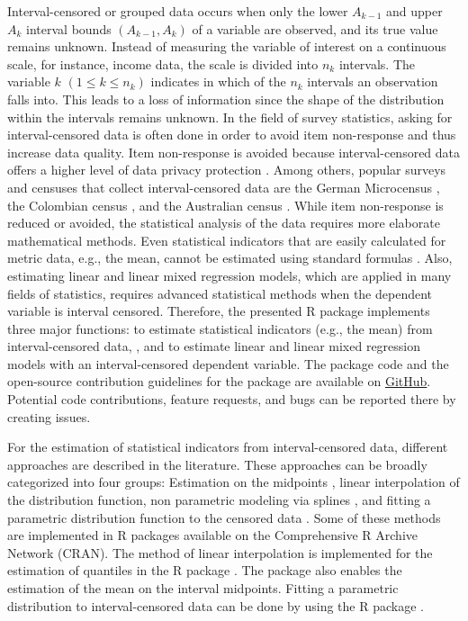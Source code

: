 Interval-censored or grouped data occurs when only the lower $A_{k-1}$ and upper  $A_{k}$ interval bounds $(A_{k-1},A_{k})$ of a variable are observed, and its true value remains unknown. Instead of measuring the variable of interest on a continuous scale, for instance, income data,  the scale is divided into $n_{k}$ intervals. The variable $k$ $(1\leq k \leq n_{k})$ indicates in which of the $n_{k}$ intervals an observation falls into. This leads to a loss of information since the shape of the distribution within the intervals remains unknown. In the field of survey statistics, asking for interval-censored data is often done in order to avoid item non-response and thus increase data quality. Item non-response is avoided because interval-censored data offers a higher level of data privacy protection \citep{Hagenaars1988, Moore2000}. Among others, popular surveys and censuses that collect interval-censored data are the German Microcensus \citep{Sta17}, the Colombian census \citep{Dep05}, and the Australian census \citep{Aus11}. While item non-response is reduced or avoided, the statistical analysis of the data requires more elaborate mathematical methods. Even statistical indicators that are easily calculated for metric data, e.g., the mean, cannot be estimated using standard formulas \citep{Fah11}. Also, estimating linear and linear mixed regression models, which are applied in many fields of statistics, requires advanced statistical methods when the dependent variable is interval censored. Therefore, the presented R package implements three major functions:  to estimate statistical indicators (e.g., the mean) from interval-censored data, , and  to estimate linear and linear mixed regression models with an interval-censored dependent variable. The package code and the open-source contribution guidelines for the package are available on \href{https://github.com/chiquadrat/smicd}{GitHub}. Potential code contributions, feature requests, and bugs can be reported there by creating issues.

For the estimation of statistical indicators from interval-censored data, different approaches are described in the literature. These approaches can be broadly categorized into four groups: Estimation on the midpoints \citep{Fah11},  linear interpolation of the distribution function, non parametric modeling via splines \citep{Ber16}, and fitting a parametric distribution function to the censored data \citep{Dag77, Mcd84, Ban02}. Some of these methods are implemented in R packages available on the Comprehensive R Archive Network (CRAN). The method of linear interpolation is implemented for the estimation of quantiles in the R package  \citep{Dut08a, Dut08b}. The package also enables the estimation of the mean on the interval midpoints. Fitting a parametric distribution to interval-censored data can be done by using the R package  \citep{Del15a, Del15b}. 

